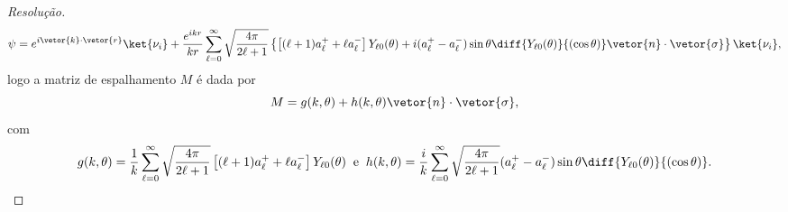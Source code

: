 \begin{proof}[Resolução]
   \begin{equation*}
      \psi = e^{i\vetor{k}\cdot\vetor{r}}\ket{\nu_i} + \frac{e^{ikr}}{kr} \sum_{\ell = 0}^\infty \sqrt{\frac{4\pi}{2\ell + 1}} \left\{\left[(\ell + 1)a_{\ell}^+ + \ell a_{\ell}^-\right]Y_{\ell 0}(\theta) + i(a_{\ell}^+ - a_{\ell}^-)\sin\theta \diff{Y_{\ell0}(\theta)}{(\cos\theta)} \vetor{n}\cdot\vetor{\sigma}\right\}\ket{\nu_i},
   \end{equation*}
   logo a matriz de espalhamento \(M\) é dada por
   \begin{equation*}
      M = g(k,\theta) + h(k,\theta)\vetor{n}\cdot\vetor{\sigma},
   \end{equation*}
   com
   \begin{equation*}
      g(k,\theta) = \frac{1}{k}\sum_{\ell = 0}^\infty \sqrt{\frac{4\pi}{2\ell + 1}} \left[(\ell + 1)a_{\ell}^+ + \ell a_{\ell}^-\right]Y_{\ell 0}(\theta)
      \;\;\text{e}\;\;
      h(k,\theta) = \frac{i}{k}\sum_{\ell = 0}^\infty \sqrt{\frac{4\pi}{2\ell + 1}} (a_{\ell}^+ - a_{\ell}^-)\sin\theta \diff{Y_{\ell0}(\theta)}{(\cos\theta)}.
   \end{equation*}
\end{proof}
